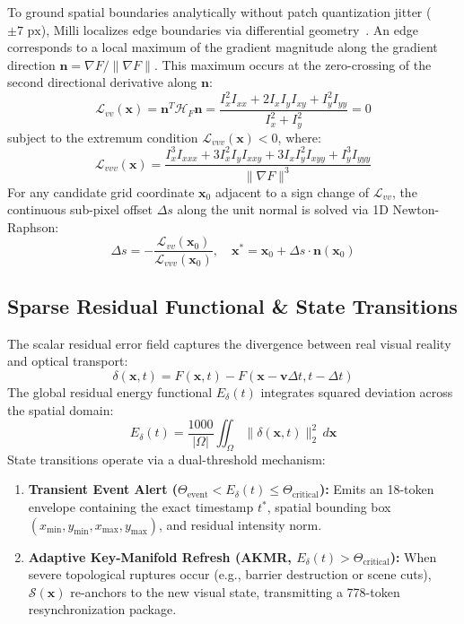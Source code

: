 \documentclass[11pt]{article}
\begin{document}
To ground spatial boundaries analytically without patch quantization jitter ($\pm 7\text{ px}$), Milli localizes edge boundaries via differential geometry~\citep{lindeberg1998edge}. An edge corresponds to a local maximum of the gradient magnitude along the gradient direction $\mathbf{n} = \nabla F / \|\nabla F\|$. This maximum occurs at the zero-crossing of the second directional derivative along $\mathbf{n}$:
\begin{equation}
\mathcal{L}_{vv}(\mathbf{x}) = \mathbf{n}^T \mathcal{H}_F \mathbf{n} = \frac{I_x^2 I_{xx} + 2 I_x I_y I_{xy} + I_y^2 I_{yy}}{I_x^2 + I_y^2} = 0
\label{eq:lvv}
\end{equation}
subject to the extremum condition $\mathcal{L}_{vvv}(\mathbf{x}) < 0$, where:
\begin{equation}
\mathcal{L}_{vvv}(\mathbf{x}) = \frac{I_x^3 I_{xxx} + 3 I_x^2 I_y I_{xxy} + 3 I_x I_y^2 I_{xyy} + I_y^3 I_{yyy}}{\|\nabla F\|^3}
\end{equation}
For any candidate grid coordinate $\mathbf{x}_0$ adjacent to a sign change of $\mathcal{L}_{vv}$, the continuous sub-pixel offset $\Delta s$ along the unit normal is solved via 1D Newton-Raphson:
\begin{equation}
\Delta s = - \frac{\mathcal{L}_{vv}(\mathbf{x}_0)}{\mathcal{L}_{vvv}(\mathbf{x}_0)}, \quad \mathbf{x}^* = \mathbf{x}_0 + \Delta s \cdot \mathbf{n}(\mathbf{x}_0)
\label{eq:newton_raphson}
\end{equation}

\subsection{Sparse Residual Functional \& State Transitions}

The scalar residual error field captures the divergence between real visual reality and optical transport:
\begin{equation}
\delta(\mathbf{x}, t) = F(\mathbf{x}, t) - F(\mathbf{x} - \mathbf{v}\Delta t, t - \Delta t)
\end{equation}
The global residual energy functional $E_\delta(t)$ integrates squared deviation across the spatial domain:
\begin{equation}
E_\delta(t) = \frac{1000}{|\Omega|} \iint_{\Omega} \|\delta(\mathbf{x}, t)\|_2^2\,d\mathbf{x}
\label{eq:residual_energy}
\end{equation}
State transitions operate via a dual-threshold mechanism:
\begin{enumerate}
    \item \textbf{Transient Event Alert ($\Theta_{\text{event}} < E_\delta(t) \le \Theta_{\text{critical}}$):} Emits an 18-token envelope containing the exact timestamp $t^*$, spatial bounding box $(x_{\min}, y_{\min}, x_{\max}, y_{\max})$, and residual intensity norm.
    \item \textbf{Adaptive Key-Manifold Refresh (AKMR, $E_\delta(t) > \Theta_{\text{critical}}$):} When severe topological ruptures occur (e.g., barrier destruction or scene cuts), $\mathcal{S}(\mathbf{x})$ re-anchors to the new visual state, transmitting a 778-token resynchronization package.
\end{enumerate}
\end{document}
